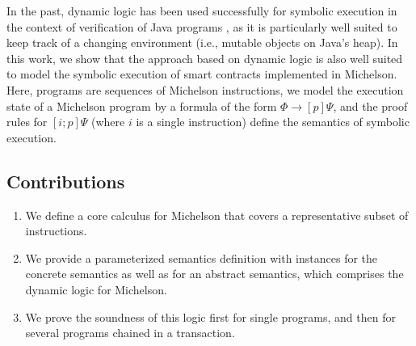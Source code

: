 \begin{comment}
  Such formulas are verified by successively reducing the program it
  contains until one is left with a purely first order formula that
  does not contain programs anymore, which can then be verified using
  the calculus of the first order logic that the DL is based on:
  \begin{align*}
    \langle i ; i' ; &\cdots ; i^n \rangle \phi
    \\ \leftrightarrow	\qquad		\langle     i' ; &\cdots ; i^n \rangle \phi'
    \\							 &\quad\vdots
    \\ \leftrightarrow	\qquad	\langle \rangle \phi^n	 &\leftrightarrow \phi^n
    \\							 &\quad\vdots
  \end{align*}

  This thesis focuses on these symbolic execution rules of the
  calculus and their soundness proof.  Firstly, we choose a
  representative subset of Michelson and give a reference
  implementation of it.  Then we define the symbolic execution rules
  for that subset and prove their soundness with respect to the
  reference implementation.
\end{comment}



In the past, dynamic
logic has been used successfully for symbolic execution in the context
of verification of Java programs \cite{KeY3}, as it is particularly
well suited to keep track of a changing environment (i.e., mutable
objects on Java's heap). 
In this work, we show that the approach based on dynamic logic is also
well suited to model the symbolic execution of smart contracts implemented
in Michelson.
Here, programs are sequences of Michelson instructions, we model the
execution state of a Michelson program by a formula of the form $\Phi \to [p]\Psi$, and the proof
rules for $[i;p]\Psi$ (where $i$ is a single instruction) define the
semantics of symbolic execution.



\subsection*{Contributions}
\label{sec:contributions}

\begin{enumerate}
\item We define a core calculus for Michelson that covers
  a representative subset of instructions.
\item We provide a parameterized semantics definition with instances
  for the concrete semantics as well as for an abstract semantics,
  which comprises the dynamic logic for Michelson. 
\item We prove the soundness of this logic first for single programs,
  and then for several programs chained in a transaction.
\end{enumerate}

